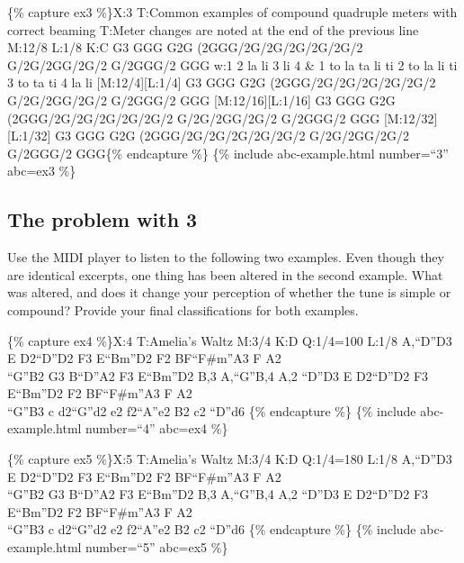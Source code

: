 \documentclass{book}
\begin{document}
\{\% capture ex3 \%\}X:3 T:Common examples of compound quadruple meters with
correct beaming T:Meter changes are noted at the end of the previous line
M:12/8 L:1/8 K:C G3 GGG G2G (2GG\textbar G/2G/2G/2G/2G/2G/2 G/2G/2GG/2G/2
G/2GGG/2 GGG\textbar\textbar{} w:1 2 la li 3 li 4 \& 1 to la ta li ti 2 to la
li ti 3 to ta ti 4 la li {[}M:12/4{]}{[}L:1/4{]} G3 GGG G2G
(2GG\textbar G/2G/2G/2G/2G/2G/2 G/2G/2GG/2G/2 G/2GGG/2 GGG\textbar\textbar{}
{[}M:12/16{]}{[}L:1/16{]} G3 GGG G2G (2GG\textbar G/2G/2G/2G/2G/2G/2
G/2G/2GG/2G/2 G/2GGG/2 GGG\textbar\textbar{} {[}M:12/32{]}{[}L:1/32{]} G3 GGG
G2G (2GG\textbar G/2G/2G/2G/2G/2G/2 G/2G/2GG/2G/2 G/2GGG/2
GGG\textbar\textbar\{\% endcapture \%\} \{\% include abc-example.html
number=``3'' abc=ex3 \%\}

\hypertarget{the-problem-with-3}{%
\subsection{The problem with 3}\label{the-problem-with-3}}

Use the MIDI player to listen to the following two examples. Even though they
are identical excerpts, one thing has been altered in the second example. What
was altered, and does it change your perception of whether the tune is simple
or compound? Provide your final classifications for both examples.

\{\% capture ex4 \%\}X:4 T:Amelia's Waltz M:3/4 K:D Q:1/4=100 L:1/8
A,\textbar{}``D''D3 E D2\textbar{}``D''D2 F3 E\textbar{}``Bm''D2 F2
BF\textbar{}``F\#m''A3 F A2\textbar{}\\
``G''B2 G3 B\textbar{}``D''A2 F3 E\textbar{}``Bm''D2 B,3 A,\textbar{}``G''B,4
A,2 \textbar{} ``D''D3 E D2\textbar{}``D''D2 F3 E\textbar{}``Bm''D2 F2
BF\textbar{}``F\#m''A3 F A2\textbar{}\\
``G''B3 c d2\textbar{}``G''d2 e2 f2\textbar{}``A''e2 B2 c2\textbar{} ``D''d6
\textbar\textbar\{\% endcapture \%\} \{\% include abc-example.html
number=``4'' abc=ex4 \%\}

\{\% capture ex5 \%\}X:5 T:Amelia's Waltz M:3/4 K:D Q:1/4=180 L:1/8
A,\textbar{}``D''D3 E D2\textbar{}``D''D2 F3 E\textbar{}``Bm''D2 F2
BF\textbar{}``F\#m''A3 F A2\textbar{}\\
``G''B2 G3 B\textbar{}``D''A2 F3 E\textbar{}``Bm''D2 B,3 A,\textbar{}``G''B,4
A,2 \textbar{} ``D''D3 E D2\textbar{}``D''D2 F3 E\textbar{}``Bm''D2 F2
BF\textbar{}``F\#m''A3 F A2\textbar{}\\
``G''B3 c d2\textbar{}``G''d2 e2 f2\textbar{}``A''e2 B2 c2\textbar{} ``D''d6
\textbar\textbar\{\% endcapture \%\} \{\% include abc-example.html
number=``5'' abc=ex5 \%\}
\end{document}
